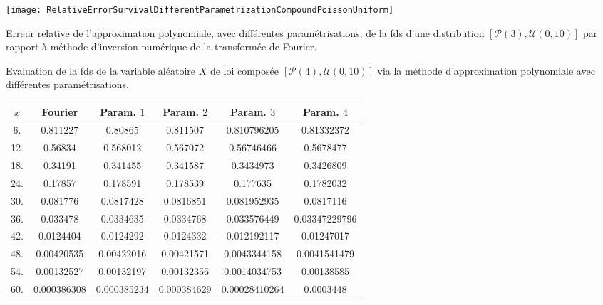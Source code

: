 \begin{figureth}			
\texttt{[image: RelativeErrorSurvivalDifferentParametrizationCompoundPoissonUniform]}
\caption{Erreur relative de l'approximation polynomiale, avec différentes paramétrisations, de la \gls{fds} d'une distribution $\left[\mathcal{P}(3),\mathcal{U}(0,10)\right]$ par rapport à méthode d\rq{}inversion numérique de la transformée de Fourier.}		
\label{RelativeErrorSurvivalDifferentParametrizationCompoundPoissonUniform}
\end{figureth}
\begin{tableth}
		\caption[Approximations polynomiales de la \gls{fds} d'une loi $\left(\mathcal{P}(4),\mathcal{U}(0,10)\right)$]{Evaluation de la \gls{fds} de la variable aléatoire $X$ de loi composée $\left[\mathcal{P}(4),\mathcal{U}(0,10)\right]$ via la méthode d'approximation polynomiale avec différentes paramétrisations.}
			\label{TableSurvivalDifferentParametrizationCompoundPoissonUniform}
		\begin{tabular}{|c||c|c|c|c|c|}
\hline
$x$ & Fourier&Param. $1$ & Param. $2$ &Param. $3$ &Param. $4$ \\
\hline
\hline
  6. & 0.811227 & 0.80865 & 0.811507 & 0.810796205 & 0.81332372 \\
 12. & 0.56834 & 0.568012 & 0.567072 & 0.56746466 & 0.5678477 \\
 18. & 0.34191 & 0.341455 & 0.341587 & 0.3434973 & 0.3426809 \\
 24. & 0.17857 & 0.178591 & 0.178539 & 0.177635 & 0.1782032 \\
 30. & 0.081776 & 0.0817428 & 0.0816851 & 0.081952935 & 0.0817116 \\
 36. & 0.033478 & 0.0334635 & 0.0334768 & 0.033576449 & 0.03347229796\\
 42. & 0.0124404 & 0.0124292 & 0.0124332 & 0.012192117 & 0.01247017 \\
 48. & 0.00420535 & 0.00422016 & 0.00421571 & 0.0043344158 & 0.0041541479 \\
 54. & 0.00132527 & 0.00132197 & 0.00132356 & 0.0014034753 & 0.00138585 \\
 60. & 0.000386308 & 0.000385234 & 0.000384629 & 0.00028410264& 0.0003448 \\


\hline
		\end{tabular}
	\end{tableth}
